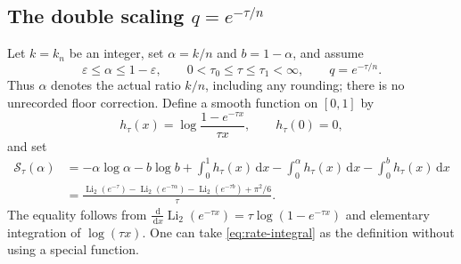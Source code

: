\documentclass[11pt,a4paper]{article}
\numberwithin{equation}{section}
\theoremstyle{definition}
\theoremstyle{remark}
\newcommand{\Li}{\operatorname{Li}}
\newcommand{\dd}{\,\mathrm d}
\begin{document}
\subsection{The double scaling \texorpdfstring{$q=e^{-\tau/n}$}{q = exp(-tau/n)}}
Let $k=k_n$ be an integer, set $\alpha=k/n$ and $b=1-\alpha$, and
assume
\begin{equation}
 \varepsilon\le\alpha\le1-\varepsilon,\qquad
 0<\tau_0\le\tau\le\tau_1<\infty,
 \qquad q=e^{-\tau/n}.
 \label{eq:double-scaling-domain}
\end{equation}
Thus $\alpha$ denotes the actual ratio $k/n$, including any rounding;
there is no unrecorded floor correction. Define a smooth function on
$[0,1]$ by
\begin{equation}
 h_\tau(x)=\log\frac{1-e^{-\tau x}}{\tau x},\qquad h_\tau(0)=0,
 \label{eq:h-tau}
\end{equation}
and set
\begin{align}
 \mathscr S_\tau(\alpha)
 &=-\alpha\log\alpha-b\log b
      +\int_0^1h_\tau(x)\dd x
      -\int_0^\alpha h_\tau(x)\dd x
      -\int_0^b h_\tau(x)\dd x
 \label{eq:rate-integral}\\
 &=\frac{\Li_2(e^{-\tau})-\Li_2(e^{-\tau\alpha})
                  -\Li_2(e^{-\tau b})+\pi^2/6}{\tau}.
 \label{eq:rate-dilog}
\end{align}
The equality follows from
$\frac{\dd}{\dd x}\Li_2(e^{-\tau x})
=\tau\log(1-e^{-\tau x})$ and elementary integration of
$\log(\tau x)$. One can take \cref{eq:rate-integral} as the definition
without using a special function.
\end{document}
